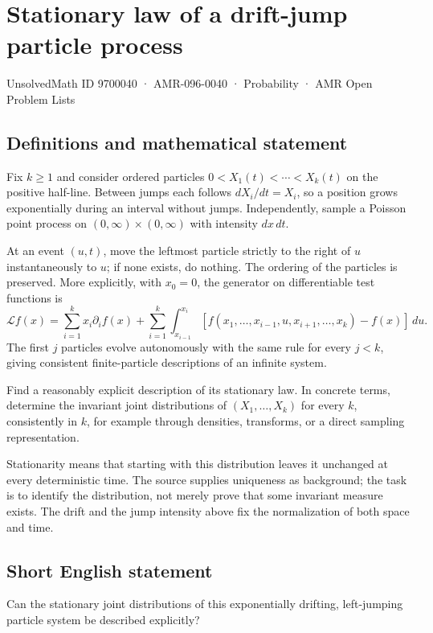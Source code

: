 \documentclass[11pt,a4paper]{article}
\begin{document}
\section*{Stationary law of a drift-jump particle process}\label{9700040}
{\small UnsolvedMath ID 9700040 · AMR-096-0040 · Probability · AMR Open Problem Lists}
\subsection{Definitions and mathematical statement}
Fix $k\ge1$ and consider ordered particles $0<X_1(t)<\cdots<X_k(t)$ on the positive half-line. Between jumps each follows $dX_i/dt=X_i$, so a position grows exponentially during an interval without jumps. Independently, sample a Poisson point process on $(0,\infty)\times(0,\infty)$ with intensity $dx\,dt$.

At an event $(u,t)$, move the leftmost particle strictly to the right of $u$ instantaneously to $u$; if none exists, do nothing. The ordering of the particles is preserved. More explicitly, with $x_0=0$, the generator on differentiable test functions is
\[
\mathcal L f(x)=\sum_{i=1}^k x_i\partial_i f(x)
+\sum_{i=1}^k\int_{x_{i-1}}^{x_i}
[f(x_1,\ldots,x_{i-1},u,x_{i+1},\ldots,x_k)-f(x)]\,du.
\]
The first $j$ particles evolve autonomously with the same rule for every $j<k$, giving consistent finite-particle descriptions of an infinite system.

Find a reasonably explicit description of its stationary law. In concrete terms, determine the invariant joint distributions of $(X_1,\ldots,X_k)$ for every $k$, consistently in $k$, for example through densities, transforms, or a direct sampling representation.

Stationarity means that starting with this distribution leaves it unchanged at every deterministic time. The source supplies uniqueness as background; the task is to identify the distribution, not merely prove that some invariant measure exists. The drift and the jump intensity above fix the normalization of both space and time.
\subsection{Short English statement}
Can the stationary joint distributions of this exponentially drifting, left-jumping particle system be described explicitly?
\end{document}
